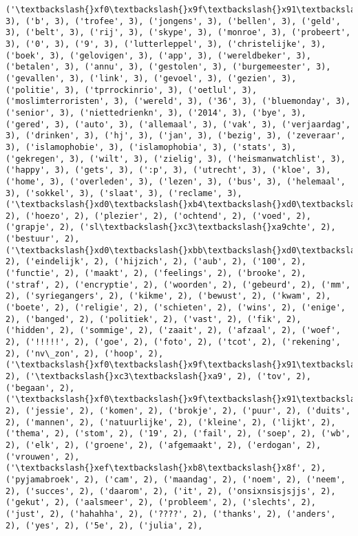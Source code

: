 \documentclass{article}
\begin{document}
\begin{Verbatim}[commandchars=\\\{\}]
('\textbackslash{}xf0\textbackslash{}x9f\textbackslash{}x91\textbackslash{}x8c', 3), ('b', 3), ('trofee', 3), ('jongens', 3), ('bellen', 3), ('geld', 3), ('belt', 3), ('rij', 3), ('skype', 3), ('monroe', 3), ('probeert', 3), ('0', 3), ('9', 3), ('lutterleppel', 3), ('christelijke', 3), ('boek', 3), ('gelovigen', 3), ('app', 3), ('wereldbeker', 3), ('betalen', 3), ('annu', 3), ('gestolen', 3), ('burgemeester', 3), ('gevallen', 3), ('link', 3), ('gevoel', 3), ('gezien', 3), ('politie', 3), ('tprrockinrio', 3), ('oetlul', 3), ('moslimterroristen', 3), ('wereld', 3), ('36', 3), ('bluemonday', 3), ('senior', 3), ('niettedrienkn', 3), ('2014', 3), ('bye', 3), ('gered', 3), ('auto', 3), ('allemaal', 3), ('vak', 3), ('verjaardag', 3), ('drinken', 3), ('hj', 3), ('jan', 3), ('bezig', 3), ('zeveraar', 3), ('islamophobie', 3), ('islamophobia', 3), ('stats', 3), ('gekregen', 3), ('wilt', 3), ('zielig', 3), ('heismanwatchlist', 3), ('happy', 3), ('gets', 3), (':p', 3), ('utrecht', 3), ('kloe', 3), ('home', 3), ('overleden', 3), ('lezen', 3), ('bus', 3), ('helemaal', 3), ('sokkel', 3), ('slaat', 3), ('reclame', 3), ('\textbackslash{}xd0\textbackslash{}xb4\textbackslash{}xd0\textbackslash{}xb5\textbackslash{}xd0\textbackslash{}xb2\textbackslash{}xd1\textbackslash{}x83\textbackslash{}xd1\textbackslash{}x88\textbackslash{}xd0\textbackslash{}xba\textbackslash{}xd0\textbackslash{}xb8', 2), ('hoezo', 2), ('plezier', 2), ('ochtend', 2), ('voed', 2), ('grapje', 2), ('sl\textbackslash{}xc3\textbackslash{}xa9chte', 2), ('bestuur', 2), ('\textbackslash{}xd0\textbackslash{}xbb\textbackslash{}xd0\textbackslash{}xb5\textbackslash{}xd1\textbackslash{}x81\textbackslash{}xd0\textbackslash{}xb1\textbackslash{}xd0\textbackslash{}xb8', 2), ('eindelijk', 2), ('hijzich', 2), ('aub', 2), ('100', 2), ('functie', 2), ('maakt', 2), ('feelings', 2), ('brooke', 2), ('straf', 2), ('encryptie', 2), ('woorden', 2), ('gebeurd', 2), ('mm', 2), ('syriegangers', 2), ('kikme', 2), ('bewust', 2), ('kwam', 2), ('boete', 2), ('religie', 2), ('schieten', 2), ('wins', 2), ('enige', 2), ('banged', 2), ('politiek', 2), ('vast', 2), ('fik', 2), ('hidden', 2), ('sommige', 2), ('zaait', 2), ('afzaal', 2), ('woef', 2), ('!!!!!', 2), ('goe', 2), ('foto', 2), ('tcot', 2), ('rekening', 2), ('nv\_zon', 2), ('hoop', 2), ('\textbackslash{}xf0\textbackslash{}x9f\textbackslash{}x91\textbackslash{}xaf', 2), ('\textbackslash{}xc3\textbackslash{}xa9', 2), ('tov', 2), ('begaan', 2), ('\textbackslash{}xf0\textbackslash{}x9f\textbackslash{}x91\textbackslash{}x8d', 2), ('jessie', 2), ('komen', 2), ('brokje', 2), ('puur', 2), ('duits', 2), ('mannen', 2), ('natuurlijke', 2), ('kleine', 2), ('lijkt', 2), ('thema', 2), ('stom', 2), ('19', 2), ('fail', 2), ('soep', 2), ('wb', 2), ('elk', 2), ('groene', 2), ('afgemaakt', 2), ('erdogan', 2), ('vrouwen', 2), ('\textbackslash{}xef\textbackslash{}xb8\textbackslash{}x8f', 2), ('pyjamabroek', 2), ('cam', 2), ('maandag', 2), ('noem', 2), ('neem', 2), ('succes', 2), ('daarom', 2), ('it', 2), ('onsixnsisjsjjs', 2), ('gekut', 2), ('aalsmeer', 2), ('probleem', 2), ('slechts', 2), ('just', 2), ('hahahha', 2), ('????', 2), ('thanks', 2), ('anders', 2), ('yes', 2), ('5e', 2), ('julia', 2), 
\end{Verbatim}
\end{document}
